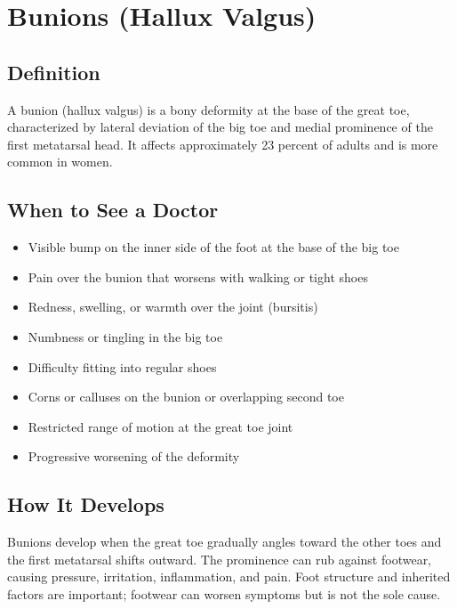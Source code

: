 \chapter{Bunions (Hallux Valgus)}

\section*{Definition}
A bunion (hallux valgus) is a bony deformity at the base of the great toe, characterized by lateral deviation of the big toe and medial prominence of the first metatarsal head. It affects approximately 23 percent of adults and is more common in women.

\section*{When to See a Doctor}
\begin{itemize}
\item Visible bump on the inner side of the foot at the base of the big toe
\item Pain over the bunion that worsens with walking or tight shoes
\item Redness, swelling, or warmth over the joint (bursitis)
\item Numbness or tingling in the big toe
\item Difficulty fitting into regular shoes
\item Corns or calluses on the bunion or overlapping second toe
\item Restricted range of motion at the great toe joint
\item Progressive worsening of the deformity
\end{itemize}

\section*{How It Develops}
Bunions develop when the great toe gradually angles toward the other toes and the first metatarsal shifts outward. The prominence can rub against footwear, causing pressure, irritation, inflammation, and pain. Foot structure and inherited factors are important; footwear can worsen symptoms but is not the sole cause.

